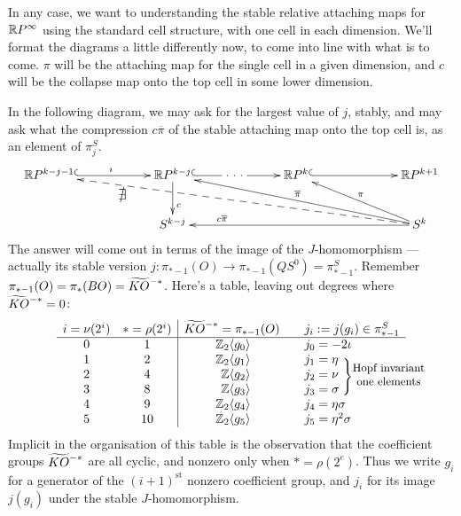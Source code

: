 In any case, we want to understanding the stable relative attaching maps for $\mathbb{R} P^\infty$ using the standard cell structure, with one cell in each dimension. We'll format the diagrams a little differently now, to come into line with what is to come. $\pi$ will be the attaching map for the single cell in a given dimension, and $c$ will be the collapse map onto the top cell in some lower dimension.

In the following diagram, we may ask for the largest value of $j$, stably, and may ask what the compression $c\overline\pi$ of the stable attaching map onto the top cell is, as an element of $\pi^S_j$.
\[\xymatrix@!0@C=3.5cm@R=1.4cm{
\RP^{k-j-1}\ar@{^{(}->}[r]^\imath &\ar[d]^(.6)c \RP^{k-j}\ar|{\ \cdot\ \cdot\ \cdot\ }@{^{(}->}[r]& \RP^k \ar@{^{(}->}[r] & \RP^{k+1}\\
&S^{k-j}&&\ar[ull]_{\overline\pi}\ar@{-->}[ulll]^(.8){\text{\large$\nexists$}}S^{k}\ar[ul]_\pi\ar[ll]_(.8){c\overline\pi}
}\]
The answer will come out in terms of the image of the $J$-homomorphism --- actually its stable version $j: \pi_{*-1}(O) \to \pi_{*-1}(QS^0) = \pi_{*-1}^S$.  Remember $\pi_{*-1}(O) = \pi_* (BO) = \widetilde{KO}\rule{0mm}{1.7ex}^{-*}$.  Here's a table, leaving out degrees where $\widetilde{KO}\rule{0mm}{1.7ex}^{-*} = 0$:
\[
\begin{array}{cc|ccl}
i=\nu(2^i) & *=\rho(2^i) & \widetilde{KO}\rule{0mm}{1.7ex}^{-*}=\pi_{*-1}(O) &&j_i:=j(g_i)\in\pi_{*-1}^S \\
\hline
0 & 1 & \makebox[1.05cm][r]{$\Z_2 \langle g_0\rangle$} && \makebox[1.4cm][l]{$j_0=-2 \iota$} \\
1 & 2 & \makebox[1.05cm][r]{$\Z_2 \langle g_1\rangle$} && \makebox[1.4cm][l]{$j_1=\eta $}\\
2 & 4 & \makebox[1.05cm][r]{$\Z \langle g_2\rangle$} && \makebox[1.4cm][l]{$j_2=\nu\ \makebox[0cm][l]{\raisebox{-.5mm}[0cm][0cm]{$\Biggr\}\raisebox{-1ex}{\text{\shortstack{\small Hopf invariant\\\small\small one elements}}}$}} $}\\
3 & 8 & \makebox[1.05cm][r]{$\Z \langle  g_3\rangle$} && \makebox[1.4cm][l]{$j_3=\sigma$} \\
4 & 9 & \makebox[1.05cm][r]{$\Z_2 \langle  g_4\rangle$} && \makebox[1.4cm][l]{$j_4=\eta \sigma$} \\
5 & 10 & \makebox[1.05cm][r]{$\Z_2 \langle  g_5\rangle$} && \makebox[1.4cm][l]{$j_5=\eta^2 \sigma$}
\end{array}
\]
Implicit in the organisation of this table is the observation that the coefficient groups $\widetilde{KO}\rule{0mm}{1.7ex}^{-*}$ are all cyclic, and nonzero only when $*=\rho(2^e)$. Thus we write $g_i$ for a generator of the $(i+1)^\text{st}$ nonzero coefficient group, and $j_i$ for its image $j(g_i)$ under the stable $J$-homomorphism.

